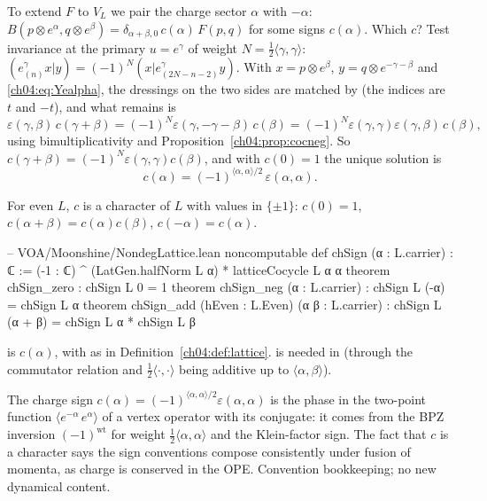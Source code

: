 To extend $F$ to $V_L$ we pair the charge sector $\alpha$ with $-\alpha$:
$B(p\otimes e^\alpha,q\otimes e^\beta)=\delta_{\alpha+\beta,0}\,c(\alpha)\,F(p,q)$ for some signs $c(\alpha)$.
Which $c$? Test invariance at the primary $u=e^\gamma$ of weight $N=\tfrac12\langle\gamma,\gamma\rangle$:
$(e^\gamma_{(n)}x|y)=(-1)^N(x|e^\gamma_{(2N-n-2)}y)$. With $x=p\otimes e^\beta$, $y=q\otimes e^{-\gamma-\beta}$
and \eqref{ch04:eq:Yealpha}, the dressings on the two sides are matched by 
(the indices are $t$ and $-t$), and what remains is
\begin{equation*}
  \varepsilon(\gamma,\beta)\,c(\gamma+\beta)=(-1)^N\varepsilon(\gamma,-\gamma-\beta)\,c(\beta)
  =(-1)^N\varepsilon(\gamma,\gamma)\varepsilon(\gamma,\beta)\,c(\beta),
\end{equation*}
using bimultiplicativity and Proposition~\ref{ch04:prop:cocneg}. So $c(\gamma+\beta)=(-1)^N\varepsilon(\gamma,\gamma)c(\beta)$,
and with $c(0)=1$ the unique solution is
\begin{equation*}
  c(\alpha)=(-1)^{\langle\alpha,\alpha\rangle/2}\,\varepsilon(\alpha,\alpha).
\end{equation*}

\begin{proposition}\label{ch04:prop:chsign}
For even $L$, $c$ is a character of $L$ with values in $\{\pm1\}$: $c(0)=1$, $c(\alpha+\beta)=c(\alpha)c(\beta)$,
$c(-\alpha)=c(\alpha)$.
\end{proposition}

\begin{leancode}
-- VOA/Moonshine/NondegLattice.lean
noncomputable def chSign (α : L.carrier) : ℂ :=
  (-1 : ℂ) ^ (LatGen.halfNorm L α) * latticeCocycle L α α
theorem chSign_zero : chSign L 0 = 1
theorem chSign_neg (α : L.carrier) : chSign L (-α) = chSign L α
theorem chSign_add (hEven : L.Even) (α β : L.carrier) :
    chSign L (α + β) = chSign L α * chSign L β
\end{leancode}

\begin{dictionary}
 is $c(\alpha)$, with  as in Definition~\ref{ch04:def:lattice}.
 is needed in  (through the commutator relation and $\tfrac12\langle\cdot,\cdot\rangle$
being additive up to $\langle\alpha,\beta\rangle$).
\end{dictionary}

\begin{physics}
The charge sign $c(\alpha)=(-1)^{\langle\alpha,\alpha\rangle/2}\varepsilon(\alpha,\alpha)$ is the phase in the two-point function $\langle e^{-\alpha}\,e^{\alpha}\rangle$ of a vertex operator with its conjugate: it comes from the BPZ inversion $(-1)^{\mathrm{wt}}$ for weight $\tfrac12\langle\alpha,\alpha\rangle$ and the Klein-factor sign. The fact that $c$ is a character says the sign conventions compose consistently under fusion of momenta, as charge is conserved in the OPE. Convention bookkeeping; no new dynamical content.
\end{physics}

